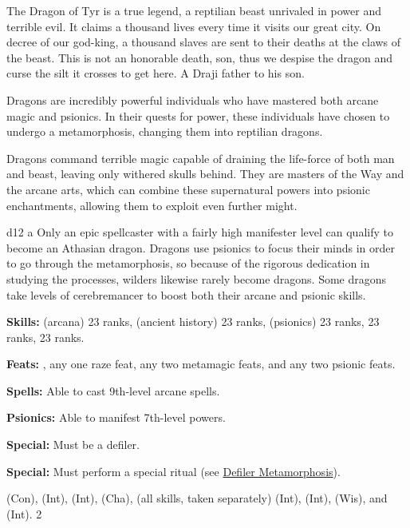 {The Dragon of Tyr is a true legend, a reptilian beast unrivaled in power and terrible evil. It claims a thousand lives every time it visits our great city. On decree of our god-king, a thousand slaves are sent to their deaths at the claws of the beast. This is not an honorable death, son, thus we despise the dragon and curse the silt it crosses to get here.}
{A Draji father to his son.}
{
Dragons are incredibly powerful individuals who have mastered both arcane magic and psionics. In their quests for power, these individuals have chosen to undergo a metamorphosis, changing them into reptilian dragons.

Dragons command terrible magic capable of draining the life-force of both man and beast, leaving only withered skulls behind. They are masters of the Way and the arcane arts, which can combine these supernatural powers into psionic enchantments, allowing them to exploit even further might.
}
{d12}
{a}
{
Only an epic spellcaster with a fairly high manifester level can qualify to become an Athasian dragon. Dragons use psionics to focus their minds in order to go through the metamorphosis, so because of the rigorous dedication in studying the processes, wilders likewise rarely become dragons. Some dragons take levels of cerebremancer to boost both their arcane and psionic skills.
}
{
\textbf{Skills:}  (arcana) 23 ranks,  (ancient history) 23 ranks,  (psionics) 23 ranks,  23 ranks,  23 ranks.

\textbf{Feats:} , any one raze feat, any two metamagic feats, and any two psionic feats.

\textbf{Spells:} Able to cast 9th-level arcane spells.

\textbf{Psionics:} Able to manifest 7th-level powers.

\textbf{Special:} Must be a defiler.

\textbf{Special:} Must perform a special ritual (see \hyperref[Defiler Metamorphosis]{Defiler Metamorphosis}).
}
{
 (Con),  (Int),  (Int),  (Cha),  (all skills, taken separately) (Int),  (Int),  (Wis), and  (Int).
}
{2}
{\WarriorTable[ll *{3}{Z{12mm}} L]}
